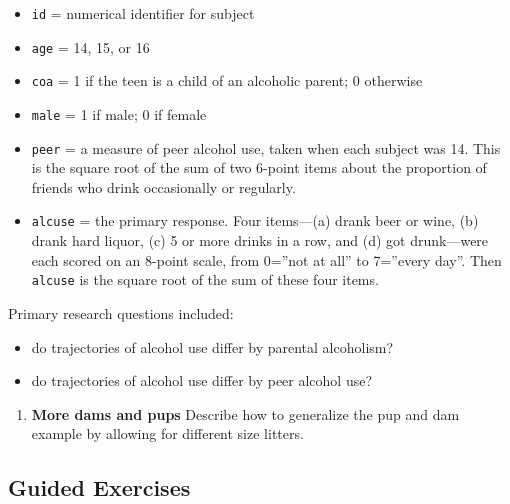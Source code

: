 \documentclass[
]{krantz}
\providecommand{\tightlist}{%
  \setlength{\itemsep}{0pt}\setlength{\parskip}{0pt}}
\begin{document}
\begin{enumerate}
  \begin{itemize}
  \tightlist
  \item
    \texttt{id} = numerical identifier for subject
  \item
    \texttt{age} = 14, 15, or 16
  \item
    \texttt{coa} = 1 if the teen is a child of an alcoholic parent; 0 otherwise
  \item
    \texttt{male} = 1 if male; 0 if female
  \item
    \texttt{peer} = a measure of peer alcohol use, taken when each subject was 14. This is the square root of the sum of two 6-point items about the proportion of friends who drink occasionally or regularly.
  \item
    \texttt{alcuse} = the primary response. Four items---(a) drank beer or wine, (b) drank hard liquor, (c) 5 or more drinks in a row, and (d) got drunk---were each scored on an 8-point scale, from 0=''not at all'' to 7=''every day''. Then \texttt{alcuse} is the square root of the sum of these four items.
  \end{itemize}

  Primary research questions included:

  \begin{itemize}
  \tightlist
  \item
    do trajectories of alcohol use differ by parental alcoholism?
  \item
    do trajectories of alcohol use differ by peer alcohol use?
  \end{itemize}
\end{enumerate}

\begin{enumerate}
\def\labelenumi{\arabic{enumi}.}
\setcounter{enumi}{1}
\tightlist
\item
  \textbf{More dams and pups} Describe how to generalize the pup and dam example by allowing for different size litters.
\end{enumerate}

\hypertarget{guided-exercises-5}{%
\subsection{Guided Exercises}\label{guided-exercises-5}}
\end{document}
